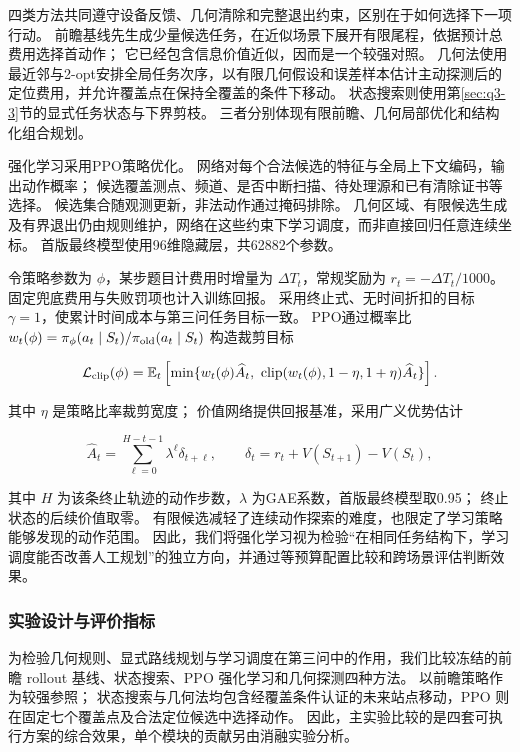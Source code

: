 \documentclass[UTF8,a4paper,zihao=5,fontset=fandol]{ctexart}
\begin{document}
四类方法共同遵守设备反馈、几何清除和完整退出约束，区别在于如何选择下一项行动。
前瞻基线先生成少量候选任务，在近似场景下展开有限尾程，依据预计总费用选择首动作；
它已经包含信息价值近似，因而是一个较强对照。
几何法使用最近邻与2-opt安排全局任务次序，以有限几何假设和误差样本估计主动探测后的定位费用，并允许覆盖点在保持全覆盖的条件下移动。
状态搜索则使用第\ref{sec:q3-3}节的显式任务状态与下界剪枝。
三者分别体现有限前瞻、几何局部优化和结构化组合规划。

强化学习采用PPO策略优化\cite{schulman2017ppo}。
网络对每个合法候选的特征与全局上下文编码，输出动作概率；
候选覆盖测点、频道、是否中断扫描、待处理源和已有清除证书等选择。
候选集合随观测更新，非法动作通过掩码排除。
几何区域、有限候选生成及有界退出仍由规则维护，网络在这些约束下学习调度，而非直接回归任意连续坐标。
首版最终模型使用96维隐藏层，共62882个参数。

令策略参数为 \(\phi\)，某步题目计费用时增量为 \(\Delta T_t\)，常规奖励为 \(r_t=-\Delta T_t/1000\)。
固定兜底费用与失败罚项也计入训练回报。
采用终止式、无时间折扣的目标 \(\gamma=1\)，使累计时间成本与第三问任务目标一致。
PPO通过概率比 \(w_t(\phi)=\pi_\phi(a_t\mid S_t)/\pi_{\rm old}(a_t\mid S_t)\) 构造裁剪目标

\begin{equation}\label{eq:q3-15}
\mathcal L_{\rm clip}(\phi)=\mathbb E_t\left[
\min\{w_t(\phi)\widehat A_t,\ 
\operatorname{clip}(w_t(\phi),1-\eta,1+\eta)\widehat A_t\}
\right].
\end{equation}

其中 \(\eta\) 是策略比率裁剪宽度；
价值网络提供回报基准，采用广义优势估计\cite{schulman2016gae}

\begin{equation}\label{eq:q3-16}
\widehat A_t=\sum_{\ell=0}^{H-t-1}\lambda^\ell\delta_{t+\ell},
\qquad \delta_t=r_t+V(S_{t+1})-V(S_t),
\end{equation}

其中 \(H\) 为该条终止轨迹的动作步数，\(\lambda\) 为GAE系数，首版最终模型取0.95；
终止状态的后续价值取零。
有限候选减轻了连续动作探索的难度，也限定了学习策略能够发现的动作范围。
因此，我们将强化学习视为检验``在相同任务结构下，学习调度能否改善人工规划''的独立方向，并通过等预算配置比较和跨场景评估判断效果。

\subsubsection{实验设计与评价指标}\label{sec:q3-8}

为检验几何规则、显式路线规划与学习调度在第三问中的作用，我们比较冻结的前瞻 rollout 基线、状态搜索、PPO 强化学习和几何探测四种方法。
以前瞻策略作为较强参照；
状态搜索与几何法均包含经覆盖条件认证的未来站点移动，PPO 则在固定七个覆盖点及合法定位候选中选择动作。
因此，主实验比较的是四套可执行方案的综合效果，单个模块的贡献另由消融实验分析。
\end{document}

